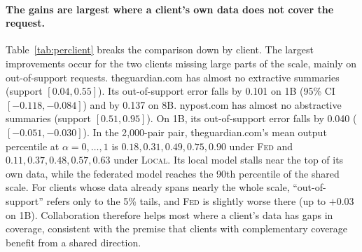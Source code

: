 \documentclass[11pt]{article}
\newcommand{\fed}{\textsc{Fed}}
\newcommand{\loc}{\textsc{Local}}
\begin{document}
\paragraph{The gains are largest where a client's own data does not cover the request.}
Table~\ref{tab:perclient} breaks the comparison down by client.
The largest improvements occur for the two clients missing large parts of the scale, mainly on out-of-support requests.
theguardian.com has almost no extractive summaries (support $[0.04, 0.55]$).
Its out-of-support error falls by 0.101 on 1B (95\% CI $[-0.118, -0.084]$) and by 0.137 on 8B.
nypost.com has almost no abstractive summaries (support $[0.51, 0.95]$).
On 1B, its out-of-support error falls by 0.040 ($[-0.051, -0.030]$).
In the 2{,}000-pair pair, theguardian.com's mean output percentile at $\alpha=0,\dots,1$ is $0.18, 0.31, 0.49, 0.75, 0.90$ under \fed{} and $0.11, 0.37, 0.48, 0.57, 0.63$ under \loc{}.
Its local model stalls near the top of its own data, while the federated model reaches the 90th percentile of the shared scale.
For clients whose data already spans nearly the whole scale, ``out-of-support'' refers only to the 5\% tails, and \fed{} is slightly worse there (up to $+0.03$ on 1B).
Collaboration therefore helps most where a client's data has gaps in coverage, consistent with the premise that clients with complementary coverage benefit from a shared direction.
\end{document}
